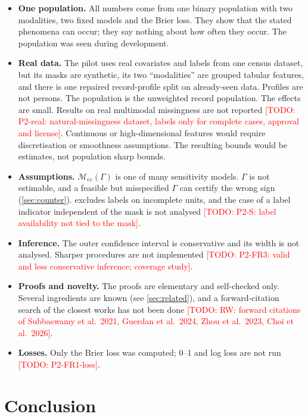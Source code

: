 \documentclass{article}
\theoremstyle{plain}
\theoremstyle{definition}
\theoremstyle{remark}
\newcommand{\todo}[1]{\textcolor{red}{[TODO: #1]}}
\newcommand{\Mcc}{\mathcal{M}_{\mathrm{cc}}}
\begin{document}
\begin{itemize}
\item \textbf{One population.} All numbers come from one binary population
with two modalities, two fixed models and the Brier loss. They show that the
stated phenomena can occur; they say nothing about how often they occur. The
population was seen during development.
\item \textbf{Real data.} The pilot uses real covariates and labels from one
census dataset, but its masks are synthetic, its two ``modalities'' are
grouped tabular features, and there is one repaired record-profile split on
already-seen data. Profiles are not persons. The population is the unweighted
record population. The effects are small. Results on real
multimodal missingness are not reported
\todo{P2-real: natural-missingness dataset, labels only for complete cases,
approval and license}. Continuous or high-dimensional features would require
discretisation or smoothness assumptions. The resulting bounds would be
estimates, not population sharp bounds.
\item \textbf{Assumptions.} $\Mcc(\Gamma)$ is one of many sensitivity models.
$\Gamma$ is not estimable, and a feasible but misspecified $\Gamma$ can
certify the wrong sign (\cref{sec:counter}).  excludes
labels on incomplete units, and the case of a label indicator independent of
the mask is not analysed \todo{P2-S: label availability not tied to the mask}.
\item \textbf{Inference.} The outer confidence interval is conservative and
its width is not analysed. Sharper procedures
\cite{imbens2004confidence,stoye2009more} are not implemented
\todo{P2-FR3: valid and less conservative inference; coverage study}.
\item \textbf{Proofs and novelty.} The proofs are elementary and self-checked
only. Several ingredients are known (see \cref{sec:related}), and a
forward-citation search of the closest works has not been done
\todo{RW: forward citations of Subbaswamy et al.\ 2021, Guerdan et al.\ 2024,
Zhou et al.\ 2023, Choi et al.\ 2026}.
\item \textbf{Losses.} Only the Brier loss was computed; 0--1 and log loss are
not run \todo{P2-FR1-loss}.
\end{itemize}

\section{Conclusion}
\label{sec:conclusion}
\end{document}
